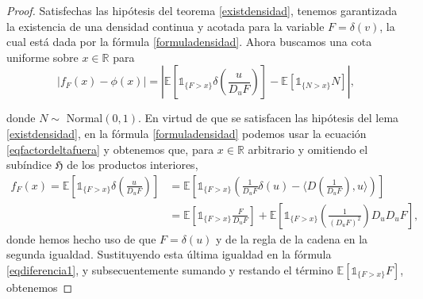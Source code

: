 \documentclass[letterpaper,twoside,12pt]{book}
\newcommand{\R}{\mathbb{R}}
\newcommand{\E}{\mathbb{E}}
\newcommand{\1}{\mathds{1}}
\newcommand{\abs}[1]{\left\lvert #1 \right\rvert}
\theoremstyle{definition}
\theoremstyle{definition}
\theoremstyle{remark}
\theoremstyle{definition}
\theoremstyle{definition}
\theoremstyle{definition}
\theoremstyle{definition}
\theoremstyle{definition}
\begin{document}
\begin{proof}
   Satisfechas las hipótesis del teorema \ref{existdensidad}, tenemos garantizada la existencia de una densidad continua y acotada para la variable $F=\delta(v)$, la cual está dada por la fórmula \eqref{formuladensidad}. Ahora buscamos una cota uniforme sobre $x\in \R$ para
   \begin{equation}\label{eqdiferencia1}
   \abs{f_F(x)-\phi(x)}=\abs{\E\left[\1_{\{F>x\}}\delta\left(\frac{u}{D_uF}\right)\right]-\E\left[\1_{\{N>x\}}N\right]}, 
   \end{equation}
  
  donde $N\sim$ Normal$(0,1)$.
   En virtud de que se satisfacen las hipótesis del lema \ref{existdensidad}, en la fórmula \eqref{formuladensidad} podemos usar la ecuación \eqref{eqfactordeltafuera} y obtenemos que, para $x\in \R$ arbitrario y omitiendo el subíndice $\mathfrak{H}$ de los productos interiores,
   \begin{align*}
   f_F(x)=\E\left[\1_{\{F>x\}}\delta\left(\frac{u}{D_uF}\right)\right]&=\E\left[\1_{\{F>x\}}\left(\frac{1}{D_{u}F}\delta(u)-\Big\langle D \left(\frac{1}{D_{u}F}\right),u \Big\rangle \right)\right]\\
   &=\E\left[\1_{\{F>x\}}\frac{F}{D_{u}F}\right]+\E\left[\1_{\{F>x\}}\left(\frac{1}{\left(D_{u}F\right)^2}\right)D_{u}D_{u}F\right],
      \end{align*}
      donde hemos hecho uso de que $F=\delta(u)$ y de la regla de la cadena en la segunda igualdad.
  Sustituyendo esta última igualdad en la fórmula \eqref{eqdiferencia1}, y subsecuentemente sumando y restando el término $\E\left[\1_{\{F>x\}}F\right]$, obtenemos
  

\end{proof}
\end{document}
